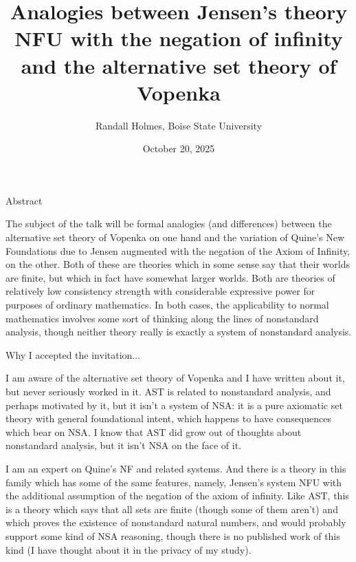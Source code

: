 \documentclass{slides}
\title{
Analogies between Jensen's theory NFU with the negation of infinity and the alternative set theory of Vopenka}
\author{Randall Holmes, Boise State University}
\date{October 20, 2025}
\begin{document}
\begin{slide}

\maketitle

\end{slide}

\begin{slide}

{\Large Abstract}

The subject of the talk will be formal analogies (and differences) between the alternative set theory of Vopenka on one hand and the variation of Quine's New Foundations due to Jensen augmented with the negation of the Axiom of Infinity, on the other.  Both of these are theories which in some sense say that their worlds are finite, but which in fact have somewhat larger worlds.  Both are theories of relatively low consistency strength with considerable expressive power for purposes of ordinary mathematics.  In both cases, the applicability to normal mathematics involves some sort of thinking along the lines of nonstandard analysis, though neither theory really is exactly a system of nonstandard analysis.

\end{slide}

\begin{slide}

\Large{Why I accepted the invitation$\ldots$}
{\small
I am aware of the alternative set theory of Vopenka and I have written about it, but never seriously worked in it.
AST is related to nonstandard analysis, and perhaps motivated by it, but it isn't a system of NSA:  it is a pure axiomatic set theory with general foundational intent, which happens to have consequences which bear on NSA.  I know that AST did grow out of thoughts about nonstandard analysis, but it isn't NSA on the face of it.

}
\end{slide}

\begin{slide}
I am an expert on Quine's NF and related systems.  And there is a theory in this family which has some of the same features, namely, Jensen's  system NFU with the additional assumption of the negation of the axiom of infinity. Like AST, this is a theory which says that all sets are finite (though some of them aren't) and which proves the existence of nonstandard natural numbers, and would probably support some kind of NSA reasoning, though there is no published work of this kind (I have thought about it in the privacy of my study).

\end{slide}
\end{document}
